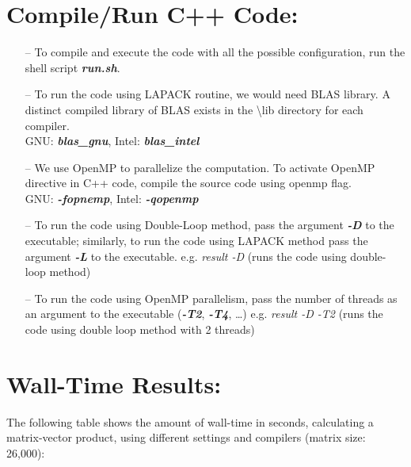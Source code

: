 \documentclass[a4paper,11pt]{article}
\begin{document}
\section*{Compile/Run C++ Code:}
\begin{itemize}
\item[--]To compile and execute the code with all the possible configuration, run the shell script \textit{\textbf{run.sh}}.
\item[--]To run the code using LAPACK routine, we would need BLAS library. A distinct compiled library of BLAS exists in the \textbackslash lib directory for each compiler.\\ GNU: \textbf{\emph{blas\_gnu}}, Intel: \textbf{\emph{blas\_intel}}
\item[--]We use OpenMP to parallelize the computation. To activate OpenMP directive in C++ code, compile the source code using openmp flag. \\GNU: \textit{\textbf{-fopnemp}}, Intel: \textit{\textbf{-qopenmp}}
\item[--]To run the code using Double-Loop method, pass the argument \textit{\textbf{-D}} to the executable; similarly, to run the code using LAPACK method pass the argument \textit{\textbf{-L}} to the executable.
e.g. \textit{result -D} (runs the code using double-loop method)
\item[--]To run the code using OpenMP parallelism, pass the number of threads as an argument to the executable (\textit{\textbf{-T2}}, \textit{\textbf{-T4}}, …)
e.g. \textit{result -D -T2}	(runs the code using double loop method with 2 threads)
\end{itemize}
\newpage

\section*{Wall-Time Results:}

The following table shows the amount of wall-time in seconds, calculating a matrix-vector product, using different settings and compilers (matrix size: 26,000):
\end{document}
